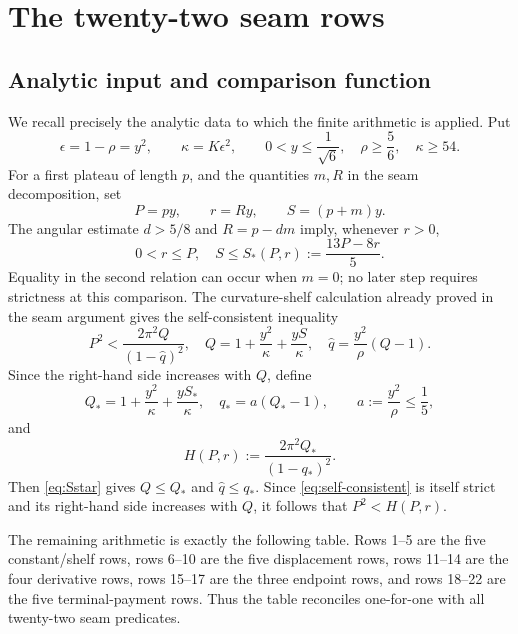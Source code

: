 \documentclass[11pt]{article}
\theoremstyle{remark}
\begin{document}
\section{The twenty-two seam rows}

\subsection{Analytic input and comparison function}

We recall precisely the analytic data to which the finite arithmetic is
applied.  Put
\[
 \epsilon=1-\rho=y^2,\qquad
 \kappa=K\epsilon^2,\qquad
 0<y\leq\frac1{\sqrt6},\quad
 \rho\geq\frac56,\quad \kappa\geq54.
\]
For a first plateau of length $p$, and the quantities $m,R$ in the seam
decomposition, set
\[
 P=py,\qquad r=Ry,\qquad S=(p+m)y.
\]
The angular estimate $d>5/8$ and $R=p-dm$ imply, whenever $r>0$,
\begin{equation}
 0<r\leq P,\quad
 S\leq S_*(P,r):=\frac{13P-8r}{5}.
 \label{eq:Sstar}
\end{equation}
Equality in the second relation can occur when \(m=0\); no later step
requires strictness at this comparison.
The curvature-shelf calculation already proved in the seam argument gives
the self-consistent inequality
\begin{equation}
 P^2<\frac{2\pi^2Q}{(1-\widehat q)^2},\quad
 Q=1+\frac{y^2}{\kappa}+\frac{yS}{\kappa},\quad
 \widehat q=\frac{y^2}{\rho}(Q-1).
 \label{eq:self-consistent}
\end{equation}
Since the right-hand side increases with $Q$, define
\begin{equation}
 Q_*=1+\frac{y^2}{\kappa}+\frac{yS_*}{\kappa},\quad
 q_*=a(Q_*-1),\qquad a:=\frac{y^2}{\rho}\leq\frac15,
 \label{eq:Qstar}
\end{equation}
and
\begin{equation}
 H(P,r):=\frac{2\pi^2Q_*}{(1-q_*)^2}.
 \label{eq:H}
\end{equation}
Then \eqref{eq:Sstar} gives \(Q\leq Q_*\) and
\(\widehat q\leq q_*\).  Since \eqref{eq:self-consistent} is itself
strict and its right-hand side increases with \(Q\), it follows that
\(P^2<H(P,r)\).

The remaining arithmetic is exactly the following table.  Rows 1--5 are
the five constant/shelf rows, rows 6--10 are the five displacement rows,
rows 11--14 are the four derivative rows, rows 15--17 are the three
endpoint rows, and rows 18--22 are the five terminal-payment rows.  Thus
the table reconciles one-for-one with all twenty-two seam predicates.
\end{document}
